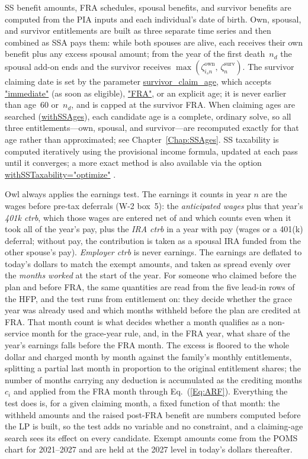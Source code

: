 \documentclass[fleqn,12pt]{report}
\newcommand{\code}[1]{\url{#1}}
\begin{document}
SS benefit amounts, FRA schedules, spousal benefits, and survivor benefits
are computed from the PIA inputs and each individual's date of birth.
Own, spousal, and survivor entitlements are built as three separate time series
and then combined as SSA pays them: while both spouses are alive, each receives
their own benefit plus any excess spousal amount; from the year of the first
death~$n_d$ the spousal add-on ends and the survivor receives
$\max(\zeta^{\text{own}}_{i_s n},\,\zeta^{\text{surv}}_{n})$.
The survivor claiming date is set by the parameter \code{survivor_claim_age},
which accepts \code{"immediate"} (as soon as eligible), \code{"FRA"}, or an
explicit age; it is never earlier than age~60 or~$n_d$, and is capped at the
survivor FRA.
When claiming ages are searched (\code{withSSAges}), each candidate age is a
complete, ordinary solve, so all three entitlements---own, spousal, and
survivor---are recomputed exactly for that age rather than approximated; see
Chapter~\ref{Chap:SSAges}.
SS taxability is computed iteratively using the provisional income formula,
updated at each pass until it converges; a more exact method is also available
via the option \code{withSSTaxability="optimize"} \cite{irs915}.

Owl always applies the earnings test.
The earnings it counts in year $n$ are the wages before pre-tax deferrals
(W-2 box~5): the \textit{anticipated wages} plus that year's \textit{401k ctrb},
which those wages are entered net of and which counts even when it took all of the
year's pay, plus the \textit{IRA ctrb} in a year with pay (wages or a 401(k)
deferral; without pay, the contribution is taken as a spousal IRA funded from the
other spouse's pay). \textit{Employer ctrb} is never earnings.
The earnings are deflated to today's dollars to match the exempt amounts, and taken as
spread evenly over the \textit{months worked} at the start of the year.
For someone who claimed before the plan and before FRA, the same quantities are
read from the five lead-in rows of the HFP, and the test runs from entitlement on:
they decide whether the grace year was already used and which months withheld
before the plan are credited at FRA.
That month count is what decides whether a month qualifies as a non-service
month for the grace-year rule, and, in the FRA year, what share of the year's
earnings falls before the FRA month.
The excess is floored to the whole dollar and charged month by month against the
family's monthly entitlements, splitting a partial last month in proportion to
the original entitlement shares; the number of months carrying any deduction is
accumulated as the crediting months $c_i$ and applied from the FRA month through
Eq.~(\ref{Eq:ARF}).
Everything the test does is, for a given claiming month, a fixed function of
that month: the withheld amounts and the raised post-FRA benefit are numbers
computed before the LP is built, so the test adds no variable and no constraint,
and a claiming-age search sees its effect on every candidate.
Exempt amounts come from the POMS chart for 2021--2027 and are held at the 2027
level in today's dollars thereafter.
\end{document}
